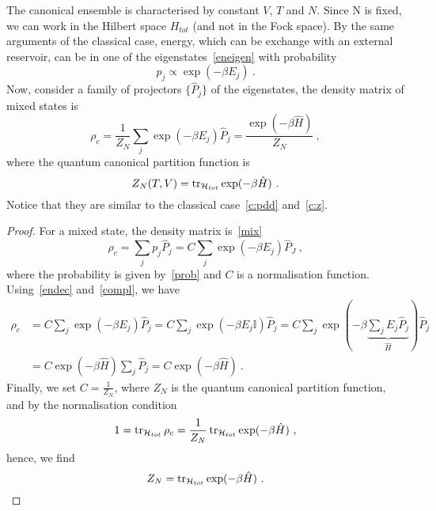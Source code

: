     The canonical ensemble is characterised by constant $V$, $T$ and $N$. Since N is fixed, we can work in the Hilbert space $H_{tot}$ (and not in the Fock space). By the same arguments of the classical case, energy, which can be exchange with an external reservoir, can be in one of the eigenstates~\eqref{eneigen} with probability 
    \begin{equation}\label{prob}
        p_j \propto \exp(- \beta E_j) ~.
    \end{equation}
    Now, consider a family of projectors $\{\hat P_j\}$ of the eigenstates, the density matrix of mixed states is 
    \begin{equation*}
        \rho_c = \frac{1}{Z_N } \sum_j \exp(- \beta E_j) \hat P_j = \frac{\exp(- \beta \hat H)}{Z_N} ~,
    \end{equation*}
    where the quantum canonical partition function is 
    \begin{equation}\label{qgc:cz}
        Z_N(T,V) = \operatorname{tr}_{\mathcal H_{tot}} \exp(- \beta \hat H) ~.
    \end{equation}
    Notice that they are similar to the classical case~\eqref{c:pdd} and~\eqref{c:z}.
    \begin{proof}
        For a mixed state, the density matrix is~\eqref{mix}
        \begin{equation*}
            \rho_c = \sum_j p_j \hat P_j = C \sum_j \exp(- \beta E_j) \hat P_J ~,
        \end{equation*}
        where the probability is given by~\eqref{prob} and $C$ is a normalisation function.
        Using~\eqref{endec} and~\eqref{compl}, we have
        \begin{equation*}
        \begin{aligned}
            \rho_c & = C \sum_j \exp(- \beta E_j) \hat P_j = C \sum_j \exp(- \beta E_j \mathbb I) \hat P_j = C \sum_j \exp(- \beta \underbrace{\sum_j E_j \hat P_j}_{\hat H}) \hat P_j \\ & = C \exp(- \beta \hat H) \sum_j \hat P_j = C \exp(- \beta \hat H) ~.
        \end{aligned}
        \end{equation*}
        Finally, we set $C = \frac{1}{Z_N}$, where $Z_N$ is the quantum canonical partition function, and by the normalisation condition
        \begin{equation*}
            1 = \operatorname{tr}_{\mathcal H_{tot}} \rho_c = \frac{1}{Z_N} \operatorname{tr}_{\mathcal H_{tot}} \exp(- \beta \hat H) ~,
        \end{equation*}
        hence, we find 
        \begin{equation*}
            Z_N = \operatorname{tr}_{\mathcal H_{tot}} \exp(- \beta \hat H) ~.
        \end{equation*}
    \end{proof}

